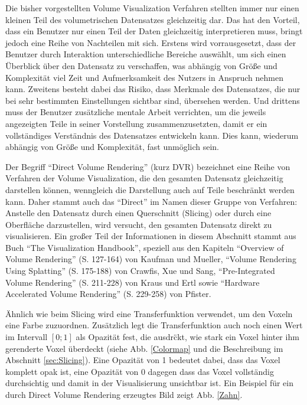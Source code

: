 \documentclass[a4paper,fontsize=12pt,toc=bib,halfparskip]{scrartcl}
\begin{document}
Die bisher vorgestellten Volume Visualization Verfahren stellten immer nur einen kleinen Teil des volumetrischen Datensatzes gleichzeitig dar. Das hat den Vorteil, dass ein Benutzer nur einen Teil der Daten gleichzeitig interpretieren muss, bringt jedoch eine Reihe von Nachteilen mit sich. Erstens wird vorrausgesetzt, dass der Benutzer durch Interaktion unterschiedliche Bereiche ausw\"ahlt, um sich einen \"Uberblick \"uber den Datensatz zu verschaffen, was abh\"angig von Gr\"o{\ss}e und Komplexit\"at viel Zeit und Aufmerksamkeit des Nutzers in Anspruch nehmen kann. Zweitens besteht dabei das Risiko, dass Merkmale des Datensatzes, die nur bei sehr bestimmten Einstellungen sichtbar sind, \"ubersehen werden. Und drittens muss der Benutzer zus\"atzliche mentale Arbeit verrichten, um die jeweils angezeigten Teile in seiner Vorstellung zusammenzusetzten, damit er ein vollst\"andiges Verst\"andnis des Datensatzes entwickeln kann. Dies kann, wiederum abh\"angig von Gr\"o{\ss}e und Komplexit\"at, fast unm\"oglich sein.

Der Begriff ``Direct Volume Rendering'' (kurz DVR) bezeichnet eine Reihe von Verfahren der Volume Visualization, die den gesamten Datensatz gleichzeitig darstellen k\"onnen, wenngleich die Darstellung auch auf Teile beschr\"ankt werden kann. Daher stammt auch das ``Direct'' im Namen dieser Gruppe von Verfahren: Anstelle den Datensatz durch einen Querschnitt (Slicing) oder durch eine Oberfl\"ache darzustellen, wird versucht, den gesamten Datensatz direkt zu visualisieren. Ein gro{\ss}er Teil der Informationen in diesem Abschnitt stammt aus Buch ``The Visualization Handbook''\cite{hansen2005visualization}, speziell aus den Kapiteln ``Overview of Volume Rendering'' (S. 127-164) von Kaufman und Mueller, ``Volume Rendering Using Splatting'' (S. 175-188) von Crawfis, Xue und Sang, ``Pre-Integrated Volume Rendering'' (S. 211-228) von Kraus und Ertl  sowie ``Hardware Accelerated Volume Rendering'' (S. 229-258) von Pfister.

\"Ahnlich wie beim Slicing wird eine Transferfunktion verwendet, um den Voxeln eine Farbe zuzuordnen. Zus\"atzlich legt die Transferfunktion auch noch einen Wert im Intervall $[0;1]$ als Opazit\"at fest, die ausdr\"ckt, wie stark ein Voxel hinter ihm gerenderte Voxel \"uberdeckt (siehe Abb. \ref{Colormap} und die Beschreibung im Abschnitt \ref{sec:Slicing}). Eine Opazit\"at von 1 bedeutet dabei, dass das Voxel komplett opak ist, eine Opazit\"at von 0 dagegen dass das Voxel vollst\"andig durchsichtig und damit in der Visualisierung unsichtbar ist. Ein Beispiel f\"ur ein durch Direct Volume Rendering erzeugtes Bild zeigt Abb. \ref{Zahn}. 
\end{document}
